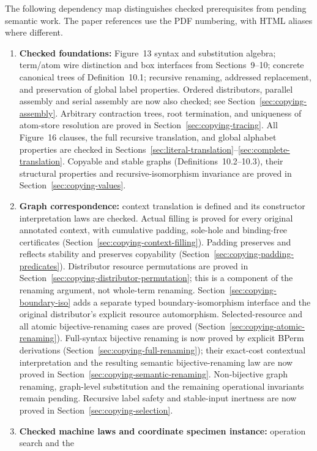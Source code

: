 The following dependency map distinguishes checked prerequisites from pending
semantic work. The paper references use the PDF numbering, with HTML aliases
where different.
\begin{enumerate}
\item \textbf{Checked foundations:} Figure~13 syntax and substitution algebra;
term/atom wire distinction and box interfaces from Sections~9--10; concrete
canonical trees of Definition~10.1; recursive renaming, addressed replacement,
and preservation of global label properties. Ordered distributors, parallel
assembly and serial assembly are now also checked; see
Section~\ref{sec:copying-assembly}. Arbitrary contraction trees, root
termination, and uniqueness of atom-store resolution are proved in
Section~\ref{sec:copying-tracing}. All Figure~16 clauses, the full recursive translation, and global alphabet
properties are checked in Sections~\ref{sec:literal-translation}--\ref{sec:complete-translation}.
Copyable and stable graphs (Definitions~10.2--10.3), their structural
properties and recursive-isomorphism invariance are proved in
Section~\ref{sec:copying-values}.
\item \textbf{Graph correspondence:} context translation is defined and its
constructor interpretation laws are checked. Actual filling is proved for
every original annotated context, with cumulative padding, sole-hole and
binding-free certificates (Section~\ref{sec:copying-context-filling}).
Padding preserves and reflects stability and preserves copyability
(Section~\ref{sec:copying-padding-predicates}).
Distributor resource permutations are proved in
Section~\ref{sec:copying-distributor-permutation}; this is a component of the
renaming argument, not whole-term renaming.
Section~\ref{sec:copying-boundary-iso} adds a separate typed boundary-isomorphism
interface and the original distributor's explicit resource automorphism.
Selected-resource and all atomic bijective-renaming cases are proved
(Section~\ref{sec:copying-atomic-renaming}). Full-syntax bijective renaming is now proved by explicit BPerm derivations
(Section~\ref{sec:copying-full-renaming}); their exact-cost contextual
interpretation and the resulting semantic bijective-renaming law are now
proved in Section~\ref{sec:copying-semantic-renaming}. Non-bijective graph
renaming, graph-level substitution and the remaining operational invariants
remain pending. Recursive label safety and stable-input
inertness are now proved in Section~\ref{sec:copying-selection}.
\item \textbf{Checked machine laws and coordinate specimen instance:} operation search and the

\end{enumerate}
